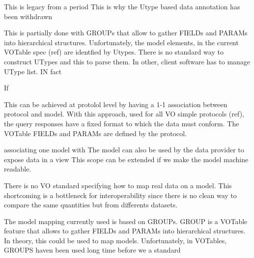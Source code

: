 \documentclass[11pt,a4paper]{ivoa}
\begin{document}
This is legacy from a period 
This is why the Utype based data annotation has been withdrawn

This is partially done with GROUPs that allow to gather FIELDs and PARAMs into hierarchical structures. Unfortunately, the model elements, in the current VOTable spec (ref) are identfied by Utypes. There is no standard way to construct UTypes and this to parse them. In other, client software has to manage UType list. IN fact 

If  


This can be achieved at protolol level by having a 1-1 association between protocol and  model. With this approach, used for all VO simple protocols (ref), the query responses have a fixed format to which the data must conform. The VOTable FIELDs and PARAMs are defined by the protocol.


associating one model with
The model can also be used by the data provider to expose data in a view
This scope can be extended if we make the model machine readable.


There is no VO standard specifying how to map real data on a model. 
This shortcoming is a bottleneck for interoperability since there is no clean way to compare the same quantities but from differents datasets. 


The model mapping currently used is based on GROUPs. GROUP is a VOTable feature that allows to gather FIELDs and PARAMs into hierarchical structures. In theory, this could be used to map models. Unfortunately, in VOTables, GROUPS haven been used long time before we a standard  
\end{document}
